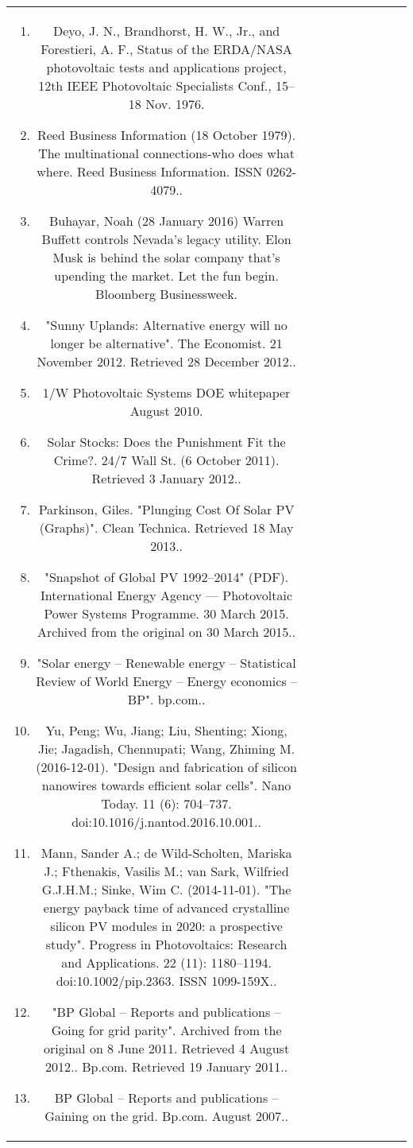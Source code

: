 \begin{table}[ht]
\begin{tabular}{|c|c|c|c|c|c|c|c|c}
\begin{enumerate}
\item Deyo, J. N., Brandhorst, H. W., Jr., and Forestieri, A. F., Status of the ERDA/NASA photovoltaic tests and applications project, 12th IEEE Photovoltaic Specialists Conf., 15–18 Nov. 1976.
\item Reed Business Information (18 October 1979). The multinational connections-who does what where. Reed Business Information. ISSN 0262-4079..
\item Buhayar, Noah (28 January 2016) Warren Buffett controls Nevada’s legacy utility. Elon Musk is behind the solar company that’s upending the market. Let the fun begin. Bloomberg Businessweek.
\item "Sunny Uplands: Alternative energy will no longer be alternative". The Economist. 21 November 2012. Retrieved 28 December 2012..
\item 1/W Photovoltaic Systems DOE whitepaper August 2010.
\item Solar Stocks: Does the Punishment Fit the Crime?. 24/7 Wall St. (6 October 2011). Retrieved 3 January 2012..
\item Parkinson, Giles. "Plunging Cost Of Solar PV (Graphs)". Clean Technica. Retrieved 18 May 2013..
\item "Snapshot of Global PV 1992–2014" (PDF). International Energy Agency — Photovoltaic Power Systems Programme. 30 March 2015. Archived from the original on 30 March 2015..
\item "Solar energy – Renewable energy – Statistical Review of World Energy – Energy economics – BP". bp.com..
\item Yu, Peng; Wu, Jiang; Liu, Shenting; Xiong, Jie; Jagadish, Chennupati; Wang, Zhiming M. (2016-12-01). "Design and fabrication of silicon nanowires towards efficient solar cells". Nano Today. 11 (6): 704–737. doi:10.1016/j.nantod.2016.10.001..
\item Mann, Sander A.; de Wild-Scholten, Mariska J.; Fthenakis, Vasilis M.; van Sark, Wilfried G.J.H.M.; Sinke, Wim C. (2014-11-01). "The energy payback time of advanced crystalline silicon PV modules in 2020: a prospective study". Progress in Photovoltaics: Research and Applications. 22 (11): 1180–1194. doi:10.1002/pip.2363. ISSN 1099-159X..
\item "BP Global – Reports and publications – Going for grid parity". Archived from the original on 8 June 2011. Retrieved 4 August 2012.. Bp.com. Retrieved 19 January 2011..
\item BP Global – Reports and publications – Gaining on the grid. Bp.com. August 2007..

\end{enumerate}
\end{tabular}
\end{table}
